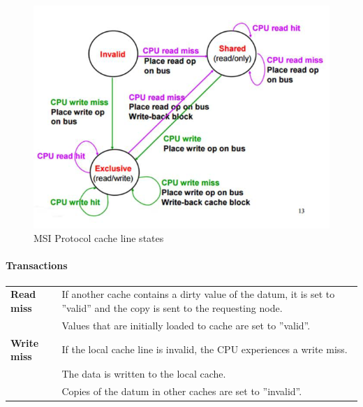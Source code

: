 			\begin{figure}[H]\centering
				\includegraphics[scale=0.5]{./pictures/MSIProtocol.png}
				\caption{MSI Protocol cache line states}
			\end{figure}
			
			\paragraph{Transactions}
			
			\begin{tabular}{|>{\bfseries}p{}|p{}|}
				\hline
				Read miss
					& If another cache contains a dirty value of the datum, it is set to ''valid'' and the copy is sent to the requesting node.\\
					& Values that are initially loaded to cache are set to ''valid''.\\
				\hline
				Write miss
					& If the local cache line is invalid, the CPU experiences a write miss.\\
					& The data is written to the local cache.\\
					& Copies of the datum in other caches are set to ''invalid''.\\ 
				\hline
			\end{tabular}